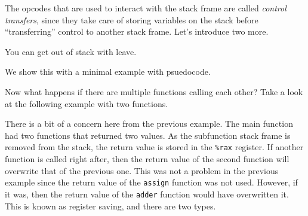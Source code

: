   \begin{example}[]
    
  \end{example}

  \begin{example}[]
    
  \end{example}

  \begin{example}[]
    
  \end{example}

  The opcodes that are used to interact with the stack frame are called \textit{control transfers}, since they take care of storing variables on the stack before ``transferring'' control to another stack frame. Let's introduce two more. 

  \begin{definition}[Continue]
    
  \end{definition}

  \begin{definition}[Leave]
    You can get out of stack with leave.
  \end{definition}

  \begin{example}
    We show this with a minimal example with psuedocode. 
  \end{example}

  \begin{example}
    Now what happens if there are multiple functions calling each other? Take a look at the following example with two functions. 
  \end{example}

  There is a bit of a concern here from the previous example. The main function had two functions that returned two values. As the subfunction stack frame is removed from the stack, the return value is stored in the \texttt{\%rax} register. If another function is called right after, then the return value of the second function will overwrite that of the previous one. This was not a problem in the previous example since the return value of the \texttt{assign} function was not used. However, if it was, then the return value of the \texttt{adder} function would have overwritten it. This is known as register saving, and there are two types. 

